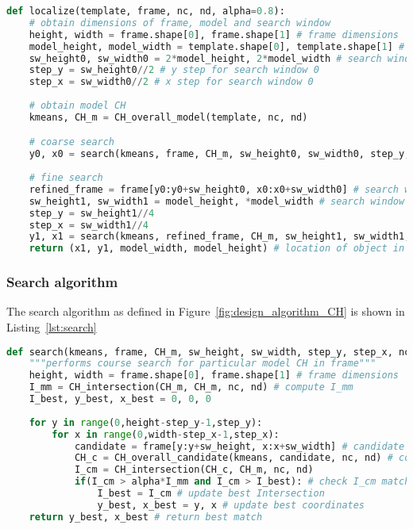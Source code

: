 \begin{lstlisting}[language=Python, caption={CCH detection localization algorithm}, captionpos=b, label={lst:localisation}]
def localize(template, frame, nc, nd, alpha=0.8):
    # obtain dimensions of frame, model and search window
    height, width = frame.shape[0], frame.shape[1] # frame dimensions
    model_height, model_width = template.shape[0], template.shape[1] # model dimensions
    sw_height0, sw_width0 = 2*model_height, 2*model_width # search window dimensions
    step_y = sw_height0//2 # y step for search window 0
    step_x = sw_width0//2 # x step for search window 0
    
    # obtain model CH
    kmeans, CH_m = CH_overall_model(template, nc, nd) 

    # coarse search
    y0, x0 = search(kmeans, frame, CH_m, sw_height0, sw_width0, step_y, step_x, nc, nd, alpha) 
    
    # fine search
    refined_frame = frame[y0:y0+sw_height0, x0:x0+sw_width0] # search within best coarse result
    sw_height1, sw_width1 = model_height, *model_width # search window dimensions
    step_y = sw_height1//4
    step_x = sw_width1//4
    y1, x1 = search(kmeans, refined_frame, CH_m, sw_height1, sw_width1, step_y, step_x, nc, nd, alpha)  
    return (x1, y1, model_width, model_height) # location of object in frame
\end{lstlisting}

\subsubsection{Search algorithm}
The search algorithm as defined in Figure~\ref{fig:design_algorithm_CH} is shown
in Listing~\ref{lst:search}
\begin{lstlisting}[language=Python, caption={CCH detection search algorithm}, captionpos=b, label={lst:search}]
def search(kmeans, frame, CH_m, sw_height, sw_width, step_y, step_x, nc, nd, alpha):
    """performs course search for particular model CH in frame"""
    height, width = frame.shape[0], frame.shape[1] # frame dimensions 
    I_mm = CH_intersection(CH_m, CH_m, nc, nd) # compute I_mm 
    I_best, y_best, x_best = 0, 0, 0
    
    for y in range(0,height-step_y-1,step_y):
        for x in range(0,width-step_x-1,step_x):
            candidate = frame[y:y+sw_height, x:x+sw_width] # candidate window 
            CH_c = CH_overall_candidate(kmeans, candidate, nc, nd) # compute candidate CH
            I_cm = CH_intersection(CH_c, CH_m, nc, nd)
            if(I_cm > alpha*I_mm and I_cm > I_best): # check I_cm match against threshold and best match
                I_best = I_cm # update best Intersection
                y_best, x_best = y, x # update best coordinates            
    return y_best, x_best # return best match
\end{lstlisting}

